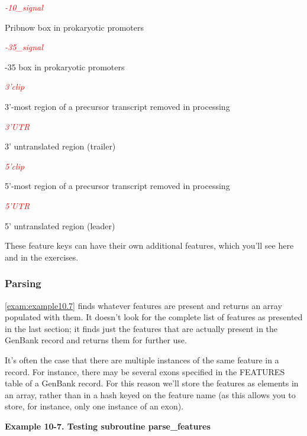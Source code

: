 \textcolor{red}{\textit{-10\_signal}}
\begin{adjustwidth}{1cm}{}
Pribnow box in prokaryotic promoters
\end{adjustwidth}

\textcolor{red}{\textit{-35\_signal}}
\begin{adjustwidth}{1cm}{}
-35 box in prokaryotic promoters
\end{adjustwidth}

\textcolor{red}{\textit{3'clip}}
\begin{adjustwidth}{1cm}{}
3'-most region of a precursor transcript removed in processing
\end{adjustwidth}

\textcolor{red}{\textit{3'UTR}}
\begin{adjustwidth}{1cm}{}
3' untranslated region (trailer)
\end{adjustwidth}

\textcolor{red}{\textit{5'clip}}
\begin{adjustwidth}{1cm}{}
5'-most region of a precursor transcript removed in processing
\end{adjustwidth}

\textcolor{red}{\textit{5'UTR}}
\begin{adjustwidth}{1cm}{}
5' untranslated region (leader)
\end{adjustwidth}

These feature keys can have their own additional features, which you'll see here and in the exercises.

\subsubsection{Parsing}
\autoref{exam:example10.7} finds whatever features are present and returns an array populated with them. It doesn't look for the complete list of features as presented in the last section; it finds just the features that are actually present in the GenBank record and returns them for further use.

It's often the case that there are multiple instances of the same feature in a record. For instance, there may be several exons specified in the FEATURES table of a GenBank record. For this reason we'll store the features as elements in an array, rather than in a hash keyed on the feature name (as this allows you to store, for instance, only one instance of an exon).

\textbf{Example 10-7. Testing subroutine parse\_features}


